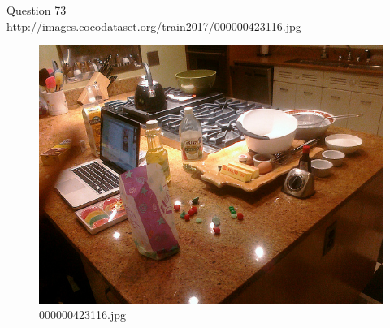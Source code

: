 Question 73\\
http://images.cocodataset.org/train2017/000000423116.jpg
\begin{figure}[h]
    \centering
    \includegraphics[width=0.8\linewidth]{../image set/hard/000000423116.jpg}
    \caption{000000423116.jpg}
\end{figure}
